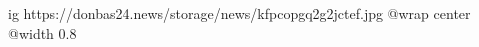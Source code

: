  
 
 
 
 

\ifcmt
  ig https://donbas24.news/storage/news/kfpcopgq2g2jctef.jpg
  @wrap center
  @width 0.8
\fi
